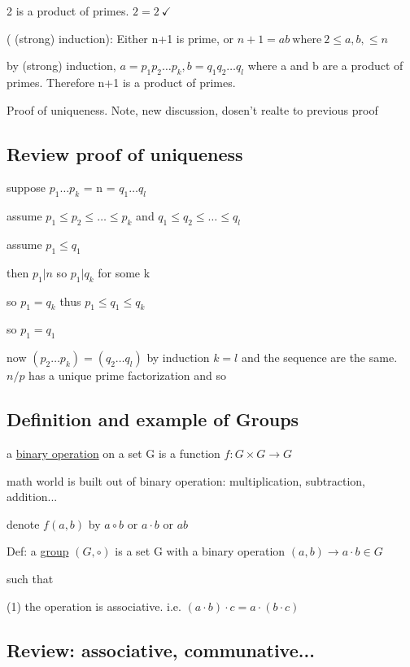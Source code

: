\documentclass[class=scrartcl, crop=false]{standalone}
\begin{document}
2 is a product of primes. $2 = 2 \ \checkmark$

( (strong) induction): Either n+1 is prime, or  $n+1 = ab \ \text{where} \ 2 \leq a, b, \leq n$

by (strong) induction, $a = p_1p_2\dots p_k, b = q_1q_2\dots q_l$ where a and b are a product of primes. Therefore n+1 is a product of primes.


Proof of uniqueness. Note, new discussion, dosen't realte to previous proof

\subsection{Review proof of uniqueness}

suppose $p_1 \dots p_k$ = n = $q_1 \dots q_l$

assume  $p_1 \leq p_2 \leq \dots \leq p_k$ and $q_1 \leq q_2 \leq \dots \leq q_l$ 

assume $p_1 \leq q_1$

then $p_1 | n $ so $p_1 | q_k$ for some k

so $p_1 = q_k$ thus $p_1 \leq q_1 \leq q_k$

so  $p_1 = q_1$

now $(p_2 \dots p_k) = (q_2 \dots q_l)$ by induction $k = l$ and the sequence are the same. $n / p$ has a unique prime factorization and so

\subsection{Definition and example of Groups}

a \underline{binary operation} on a set G is a function $f: G \times G \to G$

math world is built out of binary operation: multiplication, subtraction, addition...

denote $f(a, b) $ by $a \circ b$ or $a \cdot b$ or  $ab$

Def: a \underline{group} $(G, \circ)$ is a set G with a binary operation $(a, b) \to a \cdot b \in G$

such that 

(1) the operation is associative. i.e. $(a \cdot b) \cdot c = a \cdot (b \cdot c)$

\subsection*{Review: associative, communative...} 
\end{document}
